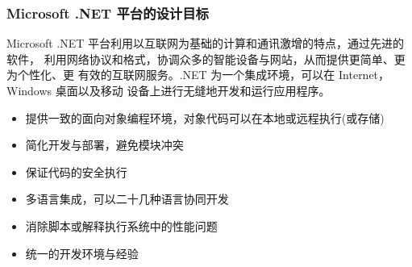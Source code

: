 \begin{frame}
\frametitle{Microsoft .NET 平台的设计目标}
\CJKindent

Microsoft .NET 平台利用以互联网为基础的计算和通讯激增的特点，通过先进的软件，
利用网络协议和格式，协调众多的智能设备与网站，从而提供更简单、更为个性化、更
有效的互联网服务。.NET 为一个集成环境，可以在 Internet，Windows 桌面以及移动
设备上进行无缝地开发和运行应用程序。

\begin{itemize}
\item 提供一致的面向对象编程环境，对象代码可以在本地或远程执行(或存储)
\item 简化开发与部署，避免模块冲突
\item 保证代码的安全执行
\item 多语言集成，可以二十几种语言协同开发
\item 消除脚本或解释执行系统中的性能问题
\item 统一的开发环境与经验
\end{itemize}

\end{frame}

